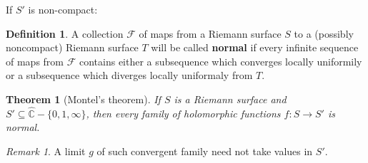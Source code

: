 \documentclass[a4paper, 11pt]{book}
\newtheorem{theorem}{Theorem}
\theoremstyle{definition}
\newtheorem{definition}{Definition}[section]
\theoremstyle{remark}
\newtheorem*{remark}{Remark}
\begin{document}
    If $S'$ is non-compact:

    \begin{definition}
        A collection $\mathcal{F}$ of maps from a Riemann surface $S$ to a (possibly noncompact) Riemann surface $T$ will be called
        \textbf{normal} if every infinite sequence of maps from $\mathcal{F}$ contains either a subsequence which converges locally
        uniformily or a subsequence which diverges locally uniformaly from $T$.
    \end{definition}

    \begin{theorem}[Montel's theorem]
        If $S$ is a Riemann surface and $S'\subseteq\hat{\mathbb{C}}-\{0,1,\infty\}$, then every family of holomorphic functions
        $f: S\to S'$ is normal.
    \end{theorem}

    \begin{remark}
        A limit $g$ of such convergent family need not take values in $S'$.
    \end{remark}
\end{document}
